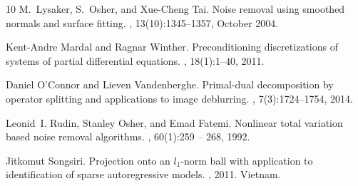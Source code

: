 \documentclass[twocolumn,envcountsame]{svjour3}
\begin{document}
\begin{thebibliography}{10}
M.~Lysaker, S.~Osher, and Xue-Cheng Tai.
\newblock Noise removal using smoothed normals and surface fitting.
, 13(10):1345--1357, October 2004.

Kent-Andre Mardal and Ragnar Winther.
\newblock Preconditioning discretizations of systems of partial differential
  equations.
, 18(1):1--40, 2011.

Daniel O'Connor and Lieven Vandenberghe.
\newblock Primal-dual decomposition by operator splitting and applications to
  image deblurring.
, 7(3):1724--1754, 2014.

Leonid~I. Rudin, Stanley Osher, and Emad Fatemi.
\newblock Nonlinear total variation based noise removal algorithms.
, 60(1):259 -- 268, 1992.

Jitkomut Songsiri.
\newblock Projection onto an $l_1$-norm ball with application to identification
  of sparse autoregressive models.
, 2011.
\newblock Vietnam.

\end{thebibliography}
\end{document}
